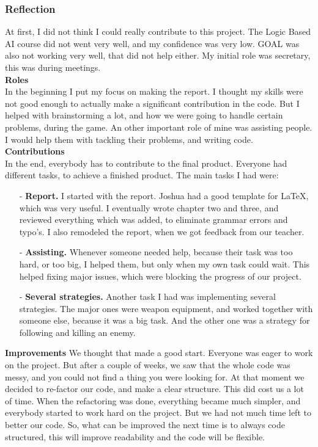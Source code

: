 \subsubsection{Reflection}
At first, I did not think I could really contribute to this project. The Logic Based AI course did not went very well, and my confidence was very low. GOAL was also not working very well, that did not help either. My initial role was secretary, this was during meetings. \\
\noindent
\textbf{Roles}\\
In the beginning I put my focus on making the report. I thought my skills were not good enough to actually make a significant contribution in the code. But I helped with brainstorming a lot, and how we were going to handle certain problems, during the game. An other important role of mine was assisting people. I would help them with tackling their problems, and writing code.\\
\noindent
\textbf{Contributions}\\
In the end, everybody has to contribute to the final product. Everyone had different tasks, to achieve a finished product. The main tasks I had were:
\begin{itemize}
	\item[-] \textbf{Report.} I started with the report. Joshua had a good template for LaTeX, which was very useful. I eventually wrote chapter two and three, and reviewed everything which was added, to eliminate grammar errors and typo's. I also remodeled the report, when we got feedback from our teacher.
	\item[-] \textbf{Assisting.} Whenever someone needed help, because their task was too hard, or too big, I helped them, but only when my own task could wait. This helped fixing major issues, which were blocking the progress of our project.
	\item[-] \textbf{Several strategies.} Another task I had was implementing several strategies. The major ones were weapon equipment, and worked together with someone else, because it was a big task. And the other one was a strategy for following and killing an enemy.
\end{itemize} 
\noindent	
\textbf{Improvements} We thought that made a good start. Everyone was eager to work on the project. But after a couple of weeks, we saw that the whole code was messy, and you could not find a thing you were looking for. At that moment we decided to re-factor our code, and make a clear structure. This did cost us a lot of time. When the refactoring was done, everything became much simpler, and everybody started to work hard on the project. But we had not much time left to better our code. So, what can be improved the next time is to always code structured, this will improve readability and the code will be flexible.\\
